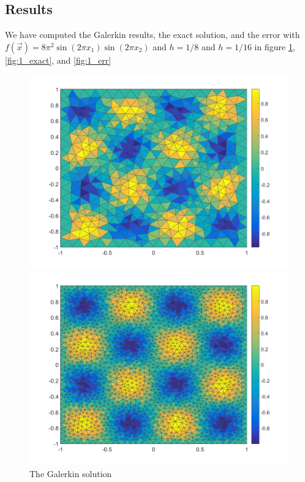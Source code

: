 \subsection{Results}
We have computed the Galerkin results, the exact solution, and the error with $f(\vec x) = 8\pi^2\sin(2\pi x_1)\sin(2\pi x_2)$ and $h = 1/8$ and $h = 1/16$ in figure \ref{fig:1_sol}, \ref{fig:1_exact}, and \ref{fig:1_err}

\begin{figure}[!Hh]
\centering
\begin{minipage}{.5\textwidth}
  \centering
  \includegraphics[width=\linewidth]{./plots/01_1_8_sol}
\end{minipage}%
\begin{minipage}{.5\textwidth}
  \centering
  \includegraphics[width=\linewidth]{./plots/01_1_16_sol}
\end{minipage}
\caption{The Galerkin solution}
\label{fig:1_sol}
\end{figure}

